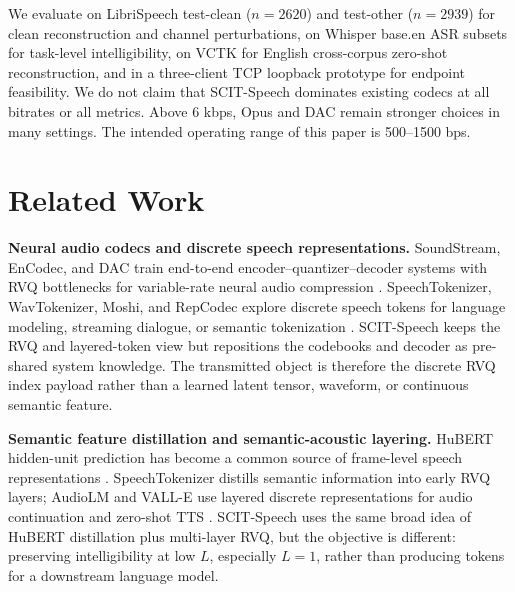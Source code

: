 \documentclass[10pt,twocolumn]{article}
\newcommand{\method}{SCIT-Speech}
\begin{document}
We evaluate on LibriSpeech test-clean (\(n=2620\)) and test-other (\(n=2939\)) for clean reconstruction and channel perturbations, on Whisper base.en ASR subsets for task-level intelligibility, on VCTK for English cross-corpus zero-shot reconstruction, and in a three-client TCP loopback prototype for endpoint feasibility. We do not claim that \method{} dominates existing codecs at all bitrates or all metrics. Above 6 kbps, Opus and DAC remain stronger choices in many settings. The intended operating range of this paper is 500--1500 bps.

\section{Related Work}

\textbf{Neural audio codecs and discrete speech representations.}
SoundStream, EnCodec, and DAC train end-to-end encoder--quantizer--decoder systems with RVQ bottlenecks for variable-rate neural audio compression \cite{zeghidour2021soundstream,defossez2022encodec,kumar2023dac}. SpeechTokenizer, WavTokenizer, Moshi, and RepCodec explore discrete speech tokens for language modeling, streaming dialogue, or semantic tokenization \cite{zhang2023speechtokenizer,ji2024wavtokenizer,defossez2024moshi,huang2023repcodec}. \method{} keeps the RVQ and layered-token view but repositions the codebooks and decoder as pre-shared system knowledge. The transmitted object is therefore the discrete RVQ index payload rather than a learned latent tensor, waveform, or continuous semantic feature.

\textbf{Semantic feature distillation and semantic-acoustic layering.}
HuBERT hidden-unit prediction has become a common source of frame-level speech representations \cite{hsu2021hubert}. SpeechTokenizer distills semantic information into early RVQ layers; AudioLM and VALL-E use layered discrete representations for audio continuation and zero-shot TTS \cite{zhang2023speechtokenizer,borsos2022audiolm,wang2023valle}. \method{} uses the same broad idea of HuBERT distillation plus multi-layer RVQ, but the objective is different: preserving intelligibility at low \(L\), especially \(L=1\), rather than producing tokens for a downstream language model.
\end{document}
